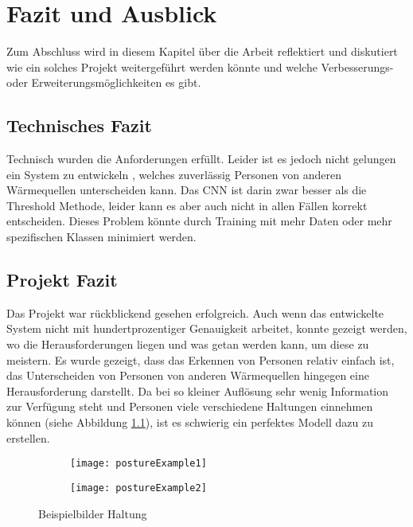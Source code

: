 \chapter{Fazit und Ausblick}
\label{ch:Ausblick}

Zum Abschluss wird in diesem Kapitel über die Arbeit reflektiert und diskutiert wie ein solches Projekt weitergeführt werden könnte und welche Verbesserungs- oder Erweiterungsmöglichkeiten es gibt.

\section{Technisches Fazit}

Technisch wurden die Anforderungen erfüllt. Leider ist es jedoch nicht gelungen ein System zu entwickeln , welches zuverlässig Personen von anderen Wärmequellen unterscheiden kann. Das \gls{CNN} ist darin zwar besser als die Threshold Methode, leider kann es aber auch nicht in allen Fällen korrekt entscheiden. Dieses Problem könnte durch Training mit mehr Daten oder mehr spezifischen Klassen minimiert werden. %

\section{Projekt Fazit}

Das Projekt war rückblickend gesehen erfolgreich. Auch wenn das entwickelte System nicht mit hundertprozentiger Genauigkeit arbeitet, konnte gezeigt werden, wo die Herausforderungen liegen und was getan werden kann, um diese zu meistern. Es wurde gezeigt, dass das Erkennen von Personen relativ einfach ist, das Unterscheiden von Personen von anderen Wärmequellen hingegen eine Herausforderung darstellt. Da bei so kleiner Auflösung sehr wenig Information zur Verfügung steht und Personen viele verschiedene Haltungen einnehmen können (siehe Abbildung \ref{fig:postureExample}), ist es schwierig ein perfektes Modell dazu zu erstellen.

\begin{figure}[H]
	\centering
	\begin{subfigure}{.4\linewidth}
		\centering
		\texttt{[image: postureExample1]}
	\end{subfigure}
	\begin{subfigure}{.4\linewidth}
		\centering
		\texttt{[image: postureExample2]}
	\end{subfigure}	
	\caption{Beispielbilder Haltung}
	\label{fig:postureExample}
\end{figure}

